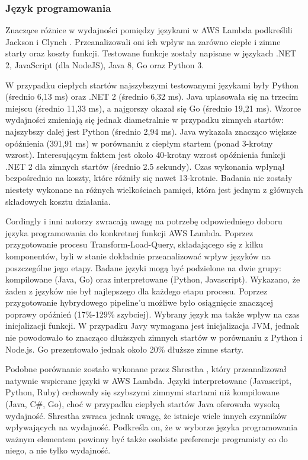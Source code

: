 \subsubsection*{Język programowania}

Znaczące różnice w wydajności pomiędzy językami w AWS Lambda podkreślili Jackson i Clynch  \cite{8605773}. Przeanalizowali oni ich wpływ na zarówno ciepłe i zimne starty oraz koszty funkcji. Testowane funkcje zostały napisane w językach .NET 2, JavaScript (dla NodeJS), Java 8, Go oraz Python 3. 

W przypadku ciepłych startów najszybszymi testowanymi językami były Python (średnio 6,13 ms) oraz  .NET 2 (średnio 6,32 ms). 
Java uplasowała się na trzecim miejscu (średnio 11,33 ms), a najgorszy okazał się Go (średnio 19,21 ms). 
Wzorce wydajności zmieniają się jednak diametralnie w przypadku zimnych startów: najszybszy dalej jest Python (średnio 2,94 ms). 
Java wykazała znacząco większe opóźnienia (391,91 ms) w porównaniu z ciepłym startem (ponad 3-krotny wzrost). 
Interesującym faktem jest około 40-krotny wzrost opóźnienia funkcji .NET 2 dla zimnych startów (średnio 2.5 sekundy). 
Czas wykonania wpłynął bezpośrednio na koszty, które różniły się nawet 13-krotnie. 
Badania nie zostały niestety wykonane na różnych wielkościach pamięci, która jest jednym z głównych składowych kosztu działania.

Cordingly i inni autorzy \cite{Cordingly2020704} zwracają uwagę na potrzebę odpowiedniego doboru języka programowania do konkretnej funkcji AWS Lambda. 
Poprzez przygotowanie procesu Transform-Load-Query, składającego się z kilku komponentów, byli w stanie dokładnie przeanalizować wpływ języków na poszczególne jego etapy. 
Badane języki mogą być podzielone na dwie grupy: kompilowane (Java, Go) oraz interpretowane (Python, Javascript). Wykazano, że żaden z języków nie był najlepszego dla każdego etapu procesu. 
Poprzez przygotowanie hybrydowego pipeline’u możliwe było osiągnięcie znaczącej poprawy opóźnień (17\%-129\% szybciej). Wybrany język ma także wpływ na czas inicjalizacji funkcji. 
W przypadku Javy wymagana jest inicjalizacja JVM, jednak nie powodowało to znacząco dłuższych zimnych startów w porównaniu z Python i Node.js. Go prezentowało jednak około 20\% dłuższe zimne starty.

Podobne porównanie zostało wykonane przez Shrestha \cite{shrestha2019lambda}, który przeanalizował natywnie wspierane języki w AWS Lambda. 
Języki interpretowane (Javascript, Python, Ruby) cechowały się szybszymi zimnymi startami niż kompilowane (Java, C\#, Go), choć w przypadku ciepłych startów Java oferowała wysoką wydajność. 
Shrestha zwraca jednak uwagę, że istnieje wiele innych czynników wpływających na wydajność. 
Podkreśla on, że w wyborze języka programowania ważnym elementem powinny być także osobiste preferencje programisty co do niego, a nie tylko wydajność.

